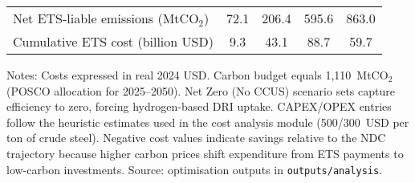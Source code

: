 \begin{table}[ht]
\begin{threeparttable}
\begin{tabular}{@{}lcccc@{}}
    Net ETS-liable emissions (MtCO$_2$) & 72.1 & 206.4 & 595.6 & 863.0 \\
    Cumulative ETS cost (billion USD) & 9.3 & 43.1 & 88.7 & 59.7 \\
    \bottomrule
  \end{tabular}
  \begin{tablenotes}
    \footnotesize
    \item Notes: Costs expressed in real 2024 USD. Carbon budget equals 1{,}110~MtCO$_2$ (POSCO allocation for 2025--2050). Net Zero (No CCUS) scenario sets capture efficiency to zero, forcing hydrogen-based DRI uptake. CAPEX/OPEX entries follow the heuristic estimates used in the cost analysis module (500/300~USD per ton of crude steel). Negative cost values indicate savings relative to the NDC trajectory because higher carbon prices shift expenditure from ETS payments to low-carbon investments. Source: optimisation outputs in \texttt{outputs/analysis}.
  \end{tablenotes}
  \end{threeparttable}
\end{table}
